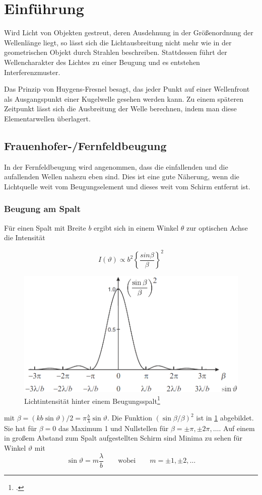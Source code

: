 \section{Einführung}
Wird Licht von Objekten gestreut, deren Ausdehnung in der Größenordnung der Wellenlänge liegt, so lässt sich die Lichtausbreitung nicht mehr wie in der geometrischen Objekt durch Strahlen beschreiben. Stattdessen führt der Wellencharakter des Lichtes zu einer Beugung und es entstehen Interferenzmuster.

Das Prinzip von Huygens-Fresnel besagt, das jeder Punkt auf einer Wellenfront als Ausgangspunkt einer Kugelwelle gesehen werden kann. Zu einem späteren Zeitpunkt lässt sich die Ausbreitung der Welle berechnen, indem man diese Elementarwellen überlagert.

\subsection{Frauenhofer-/Fernfeldbeugung}
In der Fernfeldbeugung wird angenommen, dass die einfallenden und die aufallenden Wellen nahezu eben sind. Dies ist eine gute Näherung, wenn die Lichtquelle weit vom Beugungselement und dieses weit vom Schirm entfernt ist.
\subsubsection{Beugung am Spalt}
Für einen Spalt mit Breite $b$ ergibt sich in einem Winkel $\theta$ zur optischen Achse die Intensität 

\begin{equation}
I(\vartheta)\propto b^2\left\{\frac{sin\beta}{\beta}\right\}^2
\label{spaltintens}
\end{equation}
\begin{figure}[!htb]
  \centering
  \includegraphics[width=.8\textwidth]{res/spaltintens}
  \caption{Lichtintensität hinter einem Beugungsspalt\footcite{anleitung-ss2015}}
  \label{fig:spaltintens}
\end{figure}
mit $\beta=(kb\sin\vartheta)/2=\pi\frac{b}{\lambda}\sin\vartheta$. Die Funktion $(\sin\beta/\beta)^2$ ist in \cref{fig:spaltintens} abgebildet. Sie hat für $\beta=0$ das Maximum 1 und Nullstellen für $\beta=\pm\pi, \pm 2\pi,\dots$. Auf einem in großem Abstand zum Spalt aufgestellten Schirm sind Minima zu sehen für Winkel $\vartheta$ mit 
\begin{equation}
\sin\vartheta=m\frac{\lambda}{b} \qquad\text{wobei}\qquad m=\pm1,\pm2,\dots
\label{eq:spaltmin}
\end{equation}
